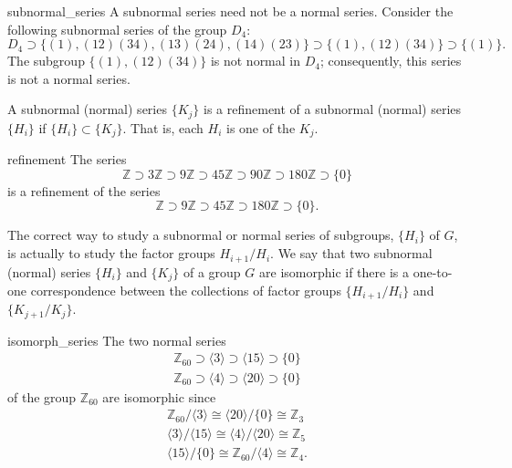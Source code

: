  
\begin{example}{subnormal_series}
A subnormal series need not be a normal series.  Consider the
following subnormal series of the group $D_4$: 
\[
D_4 \supset \{ (1),
(12)(34), (13)(24), (14)(23) \} \supset  \{  (1), (12)(34) \} 
\supset \{ (1) \}.
\]
The subgroup $\{  (1), (12)(34) \}$ is not normal in $D_4$;
consequently, this series is not a normal series.
\end{example}

 
A subnormal (normal) series $\{ K_j \}$ is a {\bfi refinement of a
subnormal (normal) series\/} $\{ H_i \}$ if $\{ H_i \} \subset \{ K_j
\}$. That is, each $H_i$ is one of the $K_j$. 
 

\begin{example}{refinement}
The series
\[
{\mathbb Z} \supset 3{\mathbb Z} \supset 9{\mathbb Z} \supset 45{\mathbb Z}
\supset 90{\mathbb Z} \supset 180{\mathbb Z} \supset \{0\}
\]
is a refinement of the series
\[
{\mathbb Z} \supset 9{\mathbb Z} \supset 45{\mathbb Z} \supset 180{\mathbb Z} 
\supset \{0\}.
\]
\end{example}

 
The correct way to study a subnormal or normal series of subgroups,
$\{ H_i \}$ of $G$, is actually to study the factor groups
$H_{i+1}/H_i$.  We say that two subnormal (normal) series $\{H_i \}$
and $\{ K_j \}$ of a group $G$ are {\bfi isomorphic\/} if there is a
one-to-one correspondence between the collections of factor groups
$\{H_{i+1}/H_i \}$ and $\{ K_{j+1}/ K_j \}$. 
 

\begin{example}{isomorph_series}
The two normal series
\begin{gather*}
{\mathbb Z}_{60} \supset \langle 3 \rangle \supset  \langle 15 \rangle
\supset \{ 0 \} \\
{\mathbb Z}_{60} \supset \langle 4 \rangle \supset  \langle 20 \rangle
\supset \{ 0 \}
\end{gather*}
of the group ${\mathbb Z}_{60}$ are isomorphic since
\begin{gather*}
{\mathbb Z}_{60} / \langle 3 \rangle \cong \langle 20 \rangle /
\{ 0 \} \cong {\mathbb Z}_{3}
\\
\langle 3 \rangle / \langle 15 \rangle
\cong \langle 4 \rangle /  \langle 20 \rangle \cong {\mathbb Z}_{5}
\\
\langle 15 \rangle / \{ 0 \} \cong {\mathbb Z}_{60} / \langle 4 \rangle
\cong {\mathbb Z}_4.
\end{gather*}
\end{example}
 

